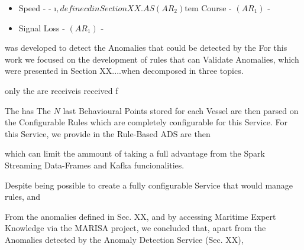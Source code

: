 \begin{itemize}
  \item Speed -  - 
  \i$ , definec d in Section XX. AS  (AR_2)$tem Course - $(AR_1)$ - 
  \item Signal Loss - $(AR_1)$ - 
\end{itemize}

was developed to detect the Anomalies that could be detected by the 
For this work we focused on the development of rules that can Validate Anomalies, which were presented in Section XX....when decomposed in three topics. 



only the are receiveis received f

The has 
The $N$ last Behavioural Points stored for each Vessel are then parsed on the Configurable Rules which are completely configurable for this Service. For this Service, we provide  in the Rule-Based ADS are then 

which can limit the ammount of taking a full advantage from the Spark Streaming Data-Frames and Kafka funcionalities.

Despite being possible to create a fully configurable Service that would manage rules, and 

From the anomalies defined in Sec. XX, and by accessing Maritime Expert Knowledge via the MARISA project, we concluded that, apart from the Anomalies detected by the Anomaly Detection Service (Sec. XX), 
\fi



